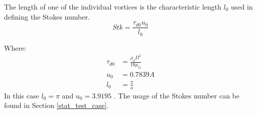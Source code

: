 \documentclass[../Interim_Report_Master]{subfiles}
\begin{document}
The length of one of the individual vortices is the characteristic length $l_0$ used in defining the Stokes number.
\begin{equation}
Stk = \frac{\tau_{d0} u_0}{l_0}
\end{equation}

Where:
\begin{subequations}
\begin{align}
\tau_{d0} &= \frac{\rho_d D^2}{18\mu_G} \\
u_0 &= 0.7839A \\
l_0 &= \frac{\pi}{a} 
\end{align}
\end{subequations}
In this case $l_0=\pi$ and $u_0=3.9195$  \cite{Elijah_GPU_Report}. The usage of the Stokes number can be found in Section \ref{stat_test_case}.
\end{document}
